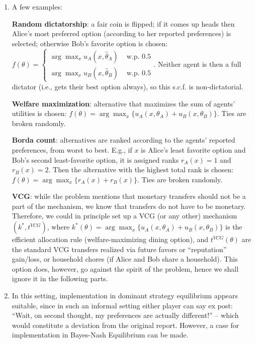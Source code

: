 \documentclass[a4paper]{article}
\begin{document}
	\begin{enumerate}
		\item A few examples:
		
		\textbf{Random dictatorship}: a fair coin is flipped; if it comes up heads then Alice's most preferred option (according to her reported preferences) is selected; otherwise Bob's favorite option is chosen: 
		$f(\theta) = \begin{cases}
			\arg \max_x u_A(x,\hat{\theta}_A) & \text{ w.p. } 0.5
			\\
			\arg \max_x u_B(x,\hat{\theta}_B) & \text{ w.p. } 0.5
		\end{cases}.$ Neither agent is then a full dictator (i.e., gets their best option always), so this s.c.f. is non-dictatorial.
	
		\textbf{Welfare maximization}: alternative that maximizes the sum of agents' utilities is chosen: $f(\theta) = \arg \max_x \{u_A(x,\theta_A) + u_B(x,\theta_B)\}$. Ties are broken randomly.
		
		\textbf{Borda count}: alternatives are ranked according to the agents' reported preferences, from worst to best. E.g., if $x$ is Alice's least favorite option and Bob's second least-favorite option, it is assigned ranks $r_A(x)=1$ and $r_B(x)=2$. Then the alternative with the highest total rank is chosen: $f(\theta) = \arg \max_x \{ r_A(x) + r_B(x) \}$. Ties are broken randomly.
		
		\textbf{VCG}: while the problem mentions that monetary transfers should not be a part of the mechanism, we know that transfers do not have to be monetary. Therefore, we could in principle set up a VCG (or any other) mechanism $(k^*,t^{VCG})$, where $k^*(\theta) = \arg \max_x \{u_A(x,\theta_A) + u_B(x,\theta_B)\}$ is the efficient allocation rule (welfare-maximizing dining option), and $t^{VCG}(\theta)$ are the standard VCG transfers realized via future favors or ``reputation'' gain/loss, or household chores (if Alice and Bob share a household). This option does, however, go against the spirit of the problem, hence we shall ignore it in the following parts.
		
		\item In this setting, implementation in dominant strategy equilibrium appears suitable, since in such an informal setting either player can say ex post: ``Wait, on second thought, my preferences are actually different!'' -- which would constitute a deviation from the original report. However, a case for implementation in Bayes-Nash Equilibrium can be made. 
		

\end{enumerate}
\end{document}
